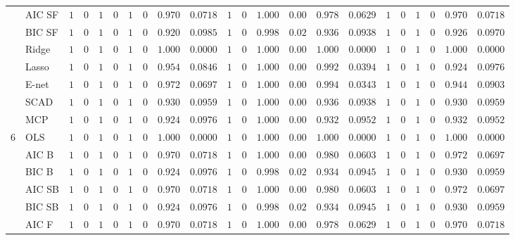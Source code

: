 \begin{tabular}{ll|ll|llllll|llllll|llllll}
 & AIC SF  & $1$ & $0$ & $1$ & $0$ & $1$ & $0$ & $0.970$ & $0.0718$ & $1$ & $0$ & $1.000$ & $0.00$ & $0.978$ & $0.0629$ & $1$ & $0$ & $1$ & $0$ & $0.970$ & $0.0718$ \\
 & BIC SF  & $1$ & $0$ & $1$ & $0$ & $1$ & $0$ & $0.920$ & $0.0985$ & $1$ & $0$ & $0.998$ & $0.02$ & $0.936$ & $0.0938$ & $1$ & $0$ & $1$ & $0$ & $0.926$ & $0.0970$ \\
 & Ridge  & $1$ & $0$ & $1$ & $0$ & $1$ & $0$ & $1.000$ & $0.0000$ & $1$ & $0$ & $1.000$ & $0.00$ & $1.000$ & $0.0000$ & $1$ & $0$ & $1$ & $0$ & $1.000$ & $0.0000$ \\
 & Lasso  & $1$ & $0$ & $1$ & $0$ & $1$ & $0$ & $0.954$ & $0.0846$ & $1$ & $0$ & $1.000$ & $0.00$ & $0.992$ & $0.0394$ & $1$ & $0$ & $1$ & $0$ & $0.924$ & $0.0976$ \\
 & E-net  & $1$ & $0$ & $1$ & $0$ & $1$ & $0$ & $0.972$ & $0.0697$ & $1$ & $0$ & $1.000$ & $0.00$ & $0.994$ & $0.0343$ & $1$ & $0$ & $1$ & $0$ & $0.944$ & $0.0903$ \\
 & SCAD  & $1$ & $0$ & $1$ & $0$ & $1$ & $0$ & $0.930$ & $0.0959$ & $1$ & $0$ & $1.000$ & $0.00$ & $0.936$ & $0.0938$ & $1$ & $0$ & $1$ & $0$ & $0.930$ & $0.0959$ \\
 & MCP  & $1$ & $0$ & $1$ & $0$ & $1$ & $0$ & $0.924$ & $0.0976$ & $1$ & $0$ & $1.000$ & $0.00$ & $0.932$ & $0.0952$ & $1$ & $0$ & $1$ & $0$ & $0.932$ & $0.0952$ \\\hline
6 & OLS  & $1$ & $0$ & $1$ & $0$ & $1$ & $0$ & $1.000$ & $0.0000$ & $1$ & $0$ & $1.000$ & $0.00$ & $1.000$ & $0.0000$ & $1$ & $0$ & $1$ & $0$ & $1.000$ & $0.0000$ \\
 & AIC B  & $1$ & $0$ & $1$ & $0$ & $1$ & $0$ & $0.970$ & $0.0718$ & $1$ & $0$ & $1.000$ & $0.00$ & $0.980$ & $0.0603$ & $1$ & $0$ & $1$ & $0$ & $0.972$ & $0.0697$ \\
 & BIC B  & $1$ & $0$ & $1$ & $0$ & $1$ & $0$ & $0.924$ & $0.0976$ & $1$ & $0$ & $0.998$ & $0.02$ & $0.934$ & $0.0945$ & $1$ & $0$ & $1$ & $0$ & $0.930$ & $0.0959$ \\
 & AIC SB  & $1$ & $0$ & $1$ & $0$ & $1$ & $0$ & $0.970$ & $0.0718$ & $1$ & $0$ & $1.000$ & $0.00$ & $0.980$ & $0.0603$ & $1$ & $0$ & $1$ & $0$ & $0.972$ & $0.0697$ \\
 & BIC SB  & $1$ & $0$ & $1$ & $0$ & $1$ & $0$ & $0.924$ & $0.0976$ & $1$ & $0$ & $0.998$ & $0.02$ & $0.934$ & $0.0945$ & $1$ & $0$ & $1$ & $0$ & $0.930$ & $0.0959$ \\
 & AIC F  & $1$ & $0$ & $1$ & $0$ & $1$ & $0$ & $0.970$ & $0.0718$ & $1$ & $0$ & $1.000$ & $0.00$ & $0.978$ & $0.0629$ & $1$ & $0$ & $1$ & $0$ & $0.970$ & $0.0718$ \\

\end{tabular}
